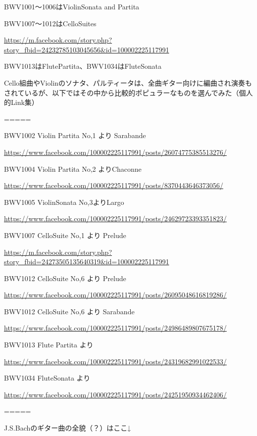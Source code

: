 \documentclass[facebook_diary.tex]{subfiles}
\begin{document}
BWV1001〜1006はViolinSonata and Partita

BWV1007〜1012はCelloSuites

\url{https://m.facebook.com/story.php?story_fbid=24232785103045656&id=100002225117991}



BWV1013はFlutePartita、BWV1034はFluteSonata


Cello組曲やViolinのソナタ、パルティータは、全曲ギター向けに編曲され演奏もされているが、以下ではその中から比較的ポピュラーなものを選んでみた（個人的Link集）

=====


BWV1002 Violin Partita No,1 より Sarabande

\url{https://www.facebook.com/100002225117991/posts/26074775385513276/}




BWV1004 Violin Partita No,2 よりChaconne

\url{https://www.facebook.com/100002225117991/posts/8370443646373056/}




BWV1005 ViolinSonata No,3よりLargo

\url{https://www.facebook.com/100002225117991/posts/24629723393351823/}




BWV1007 CelloSuite No,1 より Prelude

\url{https://m.facebook.com/story.php?story_fbid=24273505135640319&id=100002225117991}




BWV1012 CelloSuite No,6 より Prelude

\url{https://www.facebook.com/100002225117991/posts/26095048616819286/}




BWV1012 CelloSuite No,6 より Sarabande

\url{https://www.facebook.com/100002225117991/posts/24986489807675178/}




BWV1013 Flute Partita より

\url{https://www.facebook.com/100002225117991/posts/24319682991022533/}




BWV1034 FluteSonata より

\url{https://www.facebook.com/100002225117991/posts/24251950934462406/}




=====

J.S.Bachのギター曲の全貌（？）はここ↓
\end{document}
